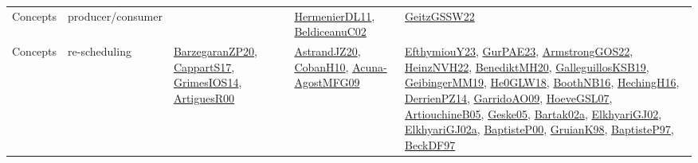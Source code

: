 {\begin{longtable}{lp{3cm}>{\raggedright}p{6cm}>{\raggedright}p{6cm}p{8cm}}
Concepts & producer/consumer &  & \href{papers/HermenierDL11.pdf}{HermenierDL11}\cite{HermenierDL11}, \href{papers/BeldiceanuC02.pdf}{BeldiceanuC02}\cite{BeldiceanuC02} & \href{papers/GeitzGSSW22.pdf}{GeitzGSSW22}\cite{GeitzGSSW22}\\
Concepts & re-scheduling & \href{papers/BarzegaranZP20.pdf}{BarzegaranZP20}\cite{BarzegaranZP20}, \href{papers/CappartS17.pdf}{CappartS17}\cite{CappartS17}, \href{articles/GrimesIOS14.pdf}{GrimesIOS14}\cite{GrimesIOS14}, \href{articles/ArtiguesR00.pdf}{ArtiguesR00}\cite{ArtiguesR00} & \href{articles/AstrandJZ20.pdf}{AstrandJZ20}\cite{AstrandJZ20}, \href{papers/CobanH10.pdf}{CobanH10}\cite{CobanH10}, \href{papers/Acuna-AgostMFG09.pdf}{Acuna-AgostMFG09}\cite{Acuna-AgostMFG09} & \href{papers/EfthymiouY23.pdf}{EfthymiouY23}\cite{EfthymiouY23}, \href{articles/GurPAE23.pdf}{GurPAE23}\cite{GurPAE23}, \href{papers/ArmstrongGOS22.pdf}{ArmstrongGOS22}\cite{ArmstrongGOS22}, \href{articles/HeinzNVH22.pdf}{HeinzNVH22}\cite{HeinzNVH22}, \href{articles/BenediktMH20.pdf}{BenediktMH20}\cite{BenediktMH20}, \href{papers/GalleguillosKSB19.pdf}{GalleguillosKSB19}\cite{GalleguillosKSB19}, \href{papers/GeibingerMM19.pdf}{GeibingerMM19}\cite{GeibingerMM19}, \href{papers/He0GLW18.pdf}{He0GLW18}\cite{He0GLW18}, \href{papers/BoothNB16.pdf}{BoothNB16}\cite{BoothNB16}, \href{papers/HechingH16.pdf}{HechingH16}\cite{HechingH16}, \href{papers/DerrienPZ14.pdf}{DerrienPZ14}\cite{DerrienPZ14}, \href{articles/GarridoAO09.pdf}{GarridoAO09}\cite{GarridoAO09}, \href{papers/HoeveGSL07.pdf}{HoeveGSL07}\cite{HoeveGSL07}, \href{papers/ArtiouchineB05.pdf}{ArtiouchineB05}\cite{ArtiouchineB05}, \href{papers/Geske05.pdf}{Geske05}\cite{Geske05}, \href{papers/Bartak02a.pdf}{Bartak02a}\cite{Bartak02a}, \href{papers/ElkhyariGJ02.pdf}{ElkhyariGJ02}\cite{ElkhyariGJ02}, \href{papers/ElkhyariGJ02a.pdf}{ElkhyariGJ02a}\cite{ElkhyariGJ02a}, \href{articles/BaptisteP00.pdf}{BaptisteP00}\cite{BaptisteP00}, \href{papers/GruianK98.pdf}{GruianK98}\cite{GruianK98}, \href{papers/BaptisteP97.pdf}{BaptisteP97}\cite{BaptisteP97}, \href{papers/BeckDF97.pdf}{BeckDF97}\cite{BeckDF97}\\

\end{longtable}}
